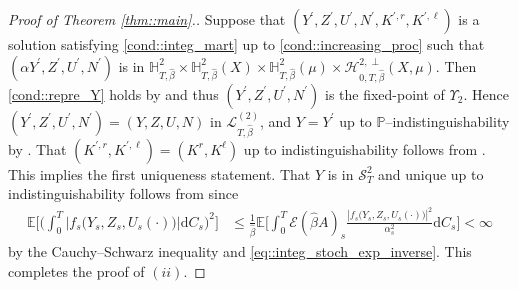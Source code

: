 \documentclass[10pt]{article} %
\newcommand\cE{\mathcal E}
\newcommand\cH{\mathcal H}
\newcommand\cL{\mathcal L}
\newcommand\cS{\mathcal S}
\def \E{\mathbb{E}}
\def \H{\mathbb{H}}
\def \P{\mathbb{P}}
\newcommand{\1}{\mathbf{1}}
\def\d{\mathrm{d}}
\begin{document}
\begin{proof}[Proof of Theorem \ref{thm::main}.]
	\medskip
	Suppose that $(Y^\prime,Z^\prime,U^\prime,N^\prime,K^{\prime,r},K^{\prime,\ell})$ is a solution satisfying \ref{cond::integ_mart} up to \ref{cond::increasing_proc} such that $(\alpha Y^\prime,Z^\prime,U^\prime,N^\prime)$ is in $\H^2_{T,\hat\beta} \times \H^2_{T,\hat\beta}(X) \times \H^2_{T,\hat\beta}(\mu) \times \cH^{2,\perp}_{0,T,\hat\beta}(X,\mu)$. Then \ref{cond::repre_Y} holds by  and thus $(Y^\prime,Z^\prime,U^\prime,N^\prime)$ is the fixed-point of $\Upsilon_2$. Hence $(Y^\prime,Z^\prime,U^\prime,N^\prime) = (Y,Z,U,N)$ in $\cL^{(2)}_{T,\hat\beta}$, and $Y = Y^\prime$ up to $\P$--indistinguishability by . That $(K^{\prime,r},K^{\prime,\ell}) = (K^r,K^\ell)$ up to indistinguishability follows from . 
	This implies the first uniqueness statement. That $Y$ is in $\cS^2_T$ and unique up to indistinguishability follows from  since
	\begin{align*}
		\E\bigg[\bigg(\int_0^T |f_s\big(Y_s,Z_s,U_s(\cdot)\big)| \d C_s\bigg)^2\bigg] 
		&\leq \frac{1}{\hat\beta}\E\bigg[\int_0^T \cE(\hat\beta A)_s\frac{|f_s\big(Y_s,Z_s,U_s(\cdot)\big)|^2}{\alpha^2_s} \d C_s\bigg] < \infty
	\end{align*}
	by the Cauchy--Schwarz inequality and \eqref{eq::integ_stoch_exp_inverse}.
	This completes the proof of $(ii)$. 
	

\end{proof}
\end{document}
